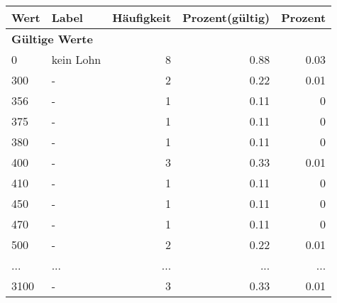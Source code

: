      \begin{longtable}{lXrrr}
     \toprule
     \textbf{Wert} & \textbf{Label} & \textbf{Häufigkeit} & \textbf{Prozent(gültig)} & \textbf{Prozent} \\
     \endhead
     \midrule
     \multicolumn{5}{l}{\textbf{Gültige Werte}}\\
        0 & \multicolumn{1}{X}{kein Lohn} & %
          \num{8} &
          \num[round-mode=places,round-precision=2]{0,88} &
          \num[round-mode=places,round-precision=2]{0,03} \\
        300 & \multicolumn{1}{X}{-} & %
          \num{2} &
          \num[round-mode=places,round-precision=2]{0,22} &
          \num[round-mode=places,round-precision=2]{0,01} \\
        356 & \multicolumn{1}{X}{-} & %
          \num{1} &
          \num[round-mode=places,round-precision=2]{0,11} &
          \num[round-mode=places,round-precision=2]{0} \\
        375 & \multicolumn{1}{X}{-} & %
          \num{1} &
          \num[round-mode=places,round-precision=2]{0,11} &
          \num[round-mode=places,round-precision=2]{0} \\
        380 & \multicolumn{1}{X}{-} & %
          \num{1} &
          \num[round-mode=places,round-precision=2]{0,11} &
          \num[round-mode=places,round-precision=2]{0} \\
        400 & \multicolumn{1}{X}{-} & %
          \num{3} &
          \num[round-mode=places,round-precision=2]{0,33} &
          \num[round-mode=places,round-precision=2]{0,01} \\
        410 & \multicolumn{1}{X}{-} & %
          \num{1} &
          \num[round-mode=places,round-precision=2]{0,11} &
          \num[round-mode=places,round-precision=2]{0} \\
        450 & \multicolumn{1}{X}{-} & %
          \num{1} &
          \num[round-mode=places,round-precision=2]{0,11} &
          \num[round-mode=places,round-precision=2]{0} \\
        470 & \multicolumn{1}{X}{-} & %
          \num{1} &
          \num[round-mode=places,round-precision=2]{0,11} &
          \num[round-mode=places,round-precision=2]{0} \\
        500 & \multicolumn{1}{X}{-} & %
          \num{2} &
          \num[round-mode=places,round-precision=2]{0,22} &
          \num[round-mode=places,round-precision=2]{0,01} \\
       ... & ... & ... & ... & ... \\
        3100 & \multicolumn{1}{X}{-} & %
          \num{3} &
          \num[round-mode=places,round-precision=2]{0,33} &
          \num[round-mode=places,round-precision=2]{0,01} \\


\end{longtable}
